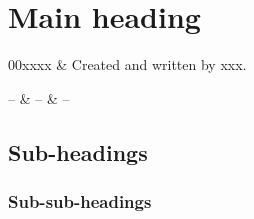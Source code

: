 %
%
\chapter{Main heading}
 \label{sec:xxx}


%
%
\starthistory
  00xxxx & Created and written by xxx.\\
\stophistory


%
%
%
\startsymbols
  -- & -- & -- \\
 \label{symtable:wfuns}     
\stopsymbols



%
%




\section{Sub-headings}
 \label{sec:xxx:xxx}

 \subsection{Sub-sub-headings} 


